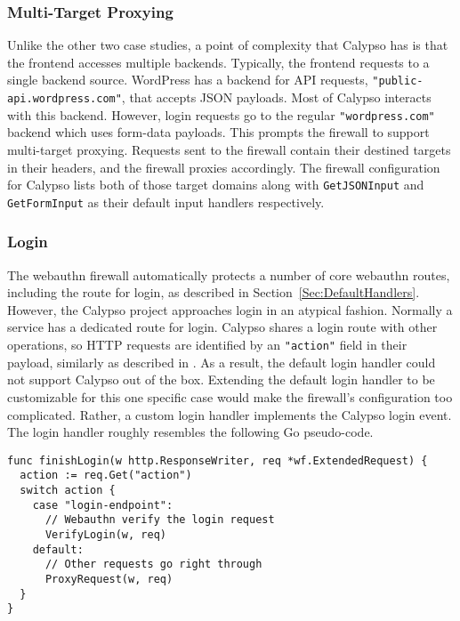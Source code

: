 \subsubsection{Multi-Target Proxying}


Unlike the other two case studies, a point of complexity that Calypso has is that the frontend accesses multiple backends. Typically, the frontend requests to a single backend source. WordPress has a backend for API requests, \lstinline{"public-api.wordpress.com"}, that accepts JSON payloads. Most of Calypso interacts with this backend. However, login requests go to the regular \lstinline{"wordpress.com"} backend which uses form-data payloads. This prompts the firewall to support multi-target proxying. Requests sent to the firewall contain their destined targets in their headers, and the firewall proxies accordingly. The firewall configuration for Calypso lists both of those target domains along with \lstinline{GetJSONInput} and \lstinline{GetFormInput} as their default input handlers respectively. 

\subsubsection{Login}\label{Sec:CalypsoLogin}

The webauthn firewall automatically protects a number of core webauthn routes, including the route for login, as described in Section~\ref{Sec:DefaultHandlers}. However, the Calypso project approaches login in an atypical fashion. Normally a service has a dedicated route for login. Calypso shares a login route with other operations, so HTTP requests are identified by an \lstinline{"action"} field in their payload, similarly as described in \label{Sec:CustomHandlers}. As a result, the default login handler could not support Calypso out of the box. Extending the default login handler to be customizable for this one specific case would make the firewall's configuration too complicated. Rather, a custom login handler implements the Calypso login event. The login handler roughly resembles the following Go pseudo-code.

\begin{lstlisting}
func finishLogin(w http.ResponseWriter, req *wf.ExtendedRequest) {
  action := req.Get("action")
  switch action {
    case "login-endpoint":
      // Webauthn verify the login request
      VerifyLogin(w, req)
    default:
      // Other requests go right through
      ProxyRequest(w, req)
  }
}
\end{lstlisting}

